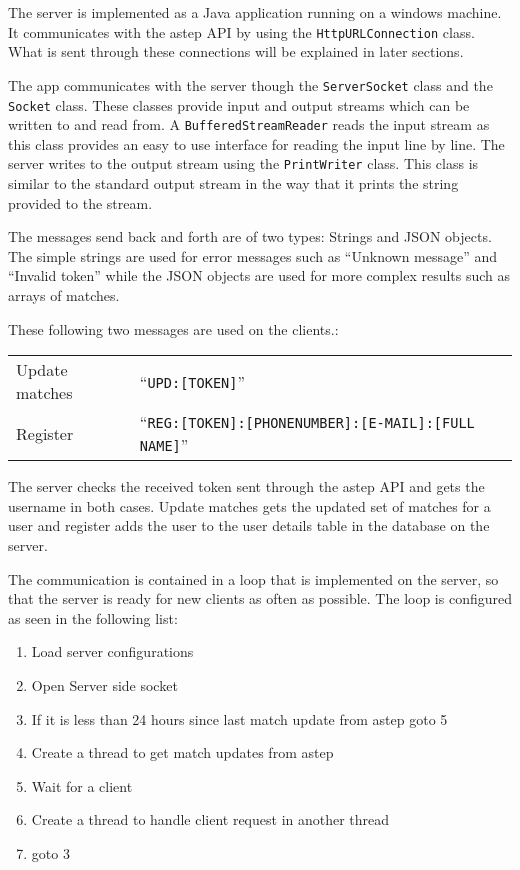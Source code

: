 The server is implemented as a Java application running on a windows machine.
It communicates with the \gls{astep} API by using the \texttt{HttpURLConnection} class.
What is sent through these connections will be explained in later sections.

The app communicates with the server though the \texttt{ServerSocket} class and the \texttt{Socket} class.
These classes provide input and output streams which can be written to and read from.
A \texttt{BufferedStreamReader} reads the input stream as this class provides an easy to use interface for reading the input line by line.
The server writes to the output stream using the \texttt{PrintWriter} class.
This class is similar to the standard output stream in the way that it prints the string provided to the stream.

The messages send back and forth are of two types: Strings and JSON objects.
The simple strings are used for error messages such as \enquote{Unknown message} and \enquote{Invalid token} while the JSON objects are used for more complex results such as arrays of matches.

These following two messages are used on the clients.:

{\centering
	\begin{tabular}{l l}
		Update matches & \enquote{\texttt{UPD:[TOKEN]}}\\
		Register & \enquote{\texttt{REG:[TOKEN]:[PHONENUMBER]:[E-MAIL]:[FULL NAME]}}
	\end{tabular}
}

The server checks the received token sent through the \gls{astep} API and gets the username in both cases.
Update matches gets the updated set of matches for a user and register adds the user to the user details table in the database on the server.

The communication is contained in a loop that is implemented on the server, so that the server is ready for new clients as often as possible.
The loop is configured as seen in the following list:

\begin{enumerate}
	\item Load server configurations
	\item Open Server side socket
	\item If it is less than 24 hours since last match update from \gls{astep} goto 5
	\item Create a thread to get match updates from \gls{astep}
	\item Wait for a client
	\item Create a thread to handle client request in another thread
	\item goto 3
\end{enumerate}

